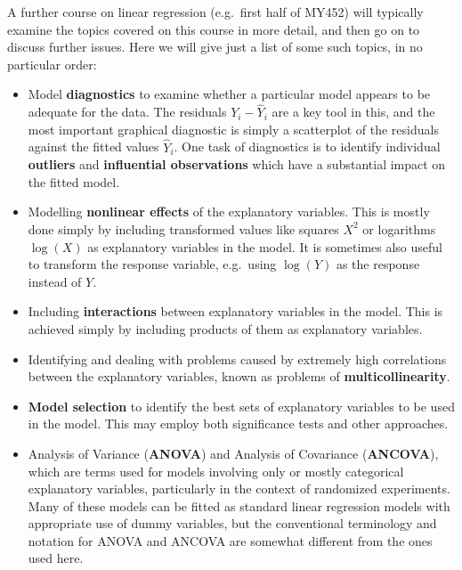 A further course on linear regression (e.g.\ first half of MY452) will
typically examine the topics covered on this course in more detail,
and then go on to discuss further issues. Here we will give just a list
of some such topics, in no particular order:
\begin{itemize}
\item
Model \textbf{diagnostics} to examine whether a particular model appears
to be adequate for the data. The residuals $Y_{i}-\hat{Y}_{i}$ are a key
tool in this, and the most important graphical diagnostic is simply a
scatterplot of the residuals against the fitted values $\hat{Y}_{i}$.
One task of diagnostics is to identify individual \textbf{outliers} and
\textbf{influential observations} which have a substantial
impact on the fitted model.
\item
Modelling \textbf{nonlinear effects} of the explanatory variables. This
is mostly done simply by including transformed values
like squares $X^{2}$ or logarithms
$\log(X)$ as explanatory variables in the model.
It is sometimes also useful to transform the response variable, e.g.\
using $\log(Y)$ as the response instead of $Y$.
\item
Including \textbf{interactions} between explanatory variables in the
model. This is achieved simply by including products of them
as explanatory variables.
\item
Identifying and dealing with problems caused by extremely high
correlations between the explanatory variables, known as problems of
\textbf{multicollinearity}.
\item
\textbf{Model selection} to identify the best sets of explanatory
variables to be used in the model. This may employ both significance tests
and other approaches.
\item
Analysis of Variance (\textbf{ANOVA}) and Analysis
of Covariance (\textbf{ANCOVA}), which are terms used for models
involving only or mostly categorical explanatory variables, particularly
in the context of randomized experiments. Many of these models can be
fitted as standard linear regression models with appropriate use of
dummy variables, but the conventional terminology and notation for ANOVA
and ANCOVA are somewhat different from the ones used here.
\end{itemize}
